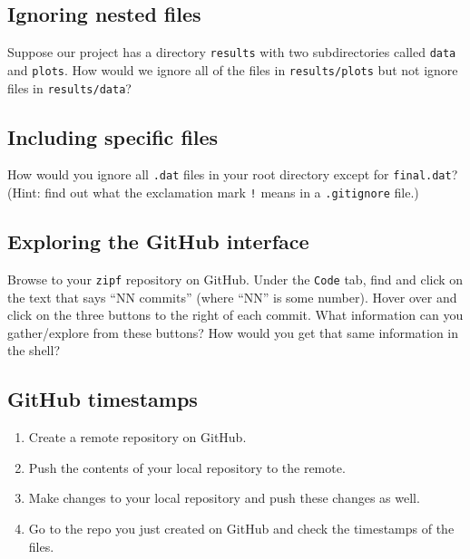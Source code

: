 \documentclass[
]{krantz}
\providecommand{\tightlist}{%
  \setlength{\itemsep}{0pt}\setlength{\parskip}{0pt}}
\begin{document}
\hypertarget{git-cmdline-ex-ignore-nested}{%
\subsection{Ignoring nested files}\label{git-cmdline-ex-ignore-nested}}

Suppose our project has a directory \texttt{results} with two subdirectories called \texttt{data} and \texttt{plots}.
How would we ignore all of the files in \texttt{results/plots}
but not ignore files in \texttt{results/data}?

\hypertarget{git-cmdline-ex-include}{%
\subsection{Including specific files}\label{git-cmdline-ex-include}}

How would you ignore all \texttt{.dat} files in your root directory except for \texttt{final.dat}?
(Hint: find out what the exclamation mark \texttt{!} means in a \texttt{.gitignore} file.)

\hypertarget{git-cmdline-ex-github-interface}{%
\subsection{Exploring the GitHub interface}\label{git-cmdline-ex-github-interface}}

Browse to your \texttt{zipf} repository on GitHub.
Under the \texttt{Code} tab,
find and click on the text that says ``NN commits'' (where ``NN'' is some number).
Hover over and click on the three buttons to the right of each commit.
What information can you gather/explore from these buttons?
How would you get that same information in the shell?

\hypertarget{git-cmdline-ex-timestamp}{%
\subsection{GitHub timestamps}\label{git-cmdline-ex-timestamp}}

\begin{enumerate}
\def\labelenumi{\arabic{enumi}.}
\tightlist
\item
  Create a remote repository on GitHub.
\item
  Push the contents of your local repository to the remote.
\item
  Make changes to your local repository and push these changes as well.
\item
  Go to the repo you just created on GitHub and check the timestamps of the files.
\end{enumerate}
\end{document}
